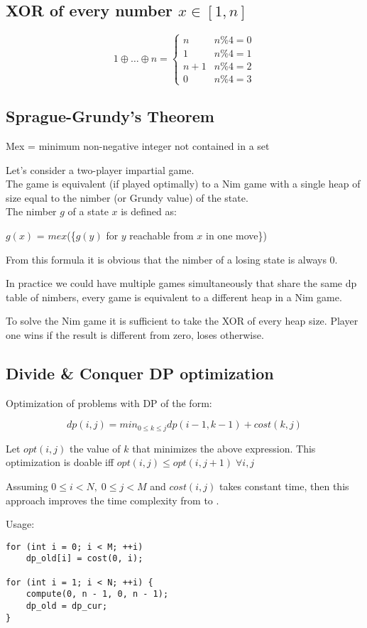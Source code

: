 \subsection{XOR of every number $x \in [1, n]$}
\[1 \oplus \ldots \oplus n =
	\begin{cases}
		n & n \% 4 = 0 \\
		1 & n \% 4 = 1 \\
		n + 1 & n \% 4 = 2 \\
		0 & n \% 4 = 3
	\end{cases}
\]


\subsection{Sprague-Grundy's Theorem}
Mex = minimum non-negative integer not contained in a set

Let's consider a two-player impartial game. \\
The game is equivalent (if played optimally) to a Nim game with a single
heap of size equal to the nimber (or Grundy value) of the state. \\
The nimber $g$ of a state $x$ is defined as:

$g(x)$ = $mex$(\{$g(y)$ for $y$ reachable from $x$ in one move\})

From this formula it is obvious that the nimber of a losing state is always 0.

In practice we could have multiple games simultaneously that share the same
dp table of nimbers, every game is equivalent to a different heap in a Nim game.

To solve the Nim game it is sufficient to take the XOR of every heap size.
Player one wins if the result is different from zero, loses otherwise.


\subsection{Divide \& Conquer DP optimization}
Optimization of problems with DP of the form:

\[dp(i, j) = min_{0 \leq k \leq j}dp(i - 1, k - 1) + cost(k, j)\]

Let $opt(i, j)$ the value of $k$ that minimizes the above expression.
This optimization is doable iff $opt(i, j) \leq opt(i, j + 1) \; \forall i, j$

Assuming $0 \leq i < N, \; 0 \leq j < M$ and $cost(i, j)$ takes constant time,
then this approach improves the time complexity from  to .

Usage:
\begin{lstlisting}
for (int i = 0; i < M; ++i)
	dp_old[i] = cost(0, i);

for (int i = 1; i < N; ++i) {
	compute(0, n - 1, 0, n - 1);
	dp_old = dp_cur;
}
\end{lstlisting}
